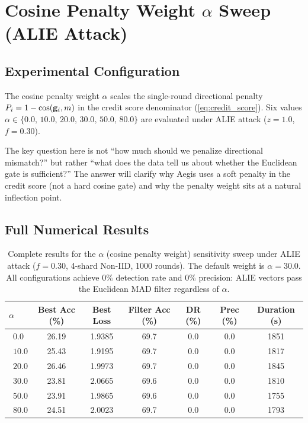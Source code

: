 \documentclass[../main]{subfiles}
\begin{document}
\section{Cosine Penalty Weight \texorpdfstring{$\alpha$}{alpha} Sweep (ALIE Attack)}
\label{app:alpha_sweep}

\subsection{Experimental Configuration}
\label{app:alpha_sweep_config}

The cosine penalty weight $\alpha$ scales the single-round directional penalty
$P_i = 1 - \cos(\mathbf{g}_{i}, m)$ in the credit score denominator
(\cref{eq:credit_score}).
Six values $\alpha \in \{0.0,\, 10.0,\, 20.0,\, 30.0,\, 50.0,\, 80.0\}$ are
evaluated under ALIE attack ($z=1.0$, $f=0.30$).

The key question here is not ``how much should we penalize directional mismatch?''
but rather ``what does the data tell us about whether the Euclidean gate is sufficient?''
The answer will clarify why Aegis uses a soft penalty in the credit score (not a hard cosine gate)
and why the penalty weight sits at a natural inflection point.

\subsection{Full Numerical Results}
\label{app:alpha_sweep_results}

\begin{table}[htbp]
\centering
\caption{Complete results for the $\alpha$ (cosine penalty weight) sensitivity sweep
under ALIE attack ($f=0.30$, 4-shard Non-IID, 1000 rounds).
The default weight is $\alpha = 30.0$. All configurations achieve $0\%$ detection rate
and $0\%$ precision: ALIE vectors pass the Euclidean MAD filter regardless of $\alpha$.}
\label{tab:app_alpha_full}
\small
\setlength{\tabcolsep}{4pt}
\begin{tabular}{lcccccc}
\toprule
$\alpha$ & \textbf{Best Acc (\%)} & \textbf{Best Loss}
         & \textbf{Filter Acc (\%)} & \textbf{DR (\%)} & \textbf{Prec (\%)}
         & \textbf{Duration (s)} \\
\midrule
$\phantom{0}0.0$  & 26.19 & 1.9385 & 69.7 & 0.0 & 0.0 & 1851 \\
$\phantom{0}10.0$ & 25.43 & 1.9195 & 69.7 & 0.0 & 0.0 & 1817 \\
$\phantom{0}20.0$ & 26.46 & 1.9973 & 69.7 & 0.0 & 0.0 & 1845 \\
$\phantom{0}30.0$ & 23.81 & 2.0665 & 69.6 & 0.0 & 0.0 & 1810 \\
$\phantom{0}50.0$ & 23.91 & 1.9865 & 69.6 & 0.0 & 0.0 & 1755 \\
$\phantom{0}80.0$ & 24.51 & 2.0023 & 69.7 & 0.0 & 0.0 & 1793 \\
\bottomrule
\end{tabular}
\end{table}
\end{document}
